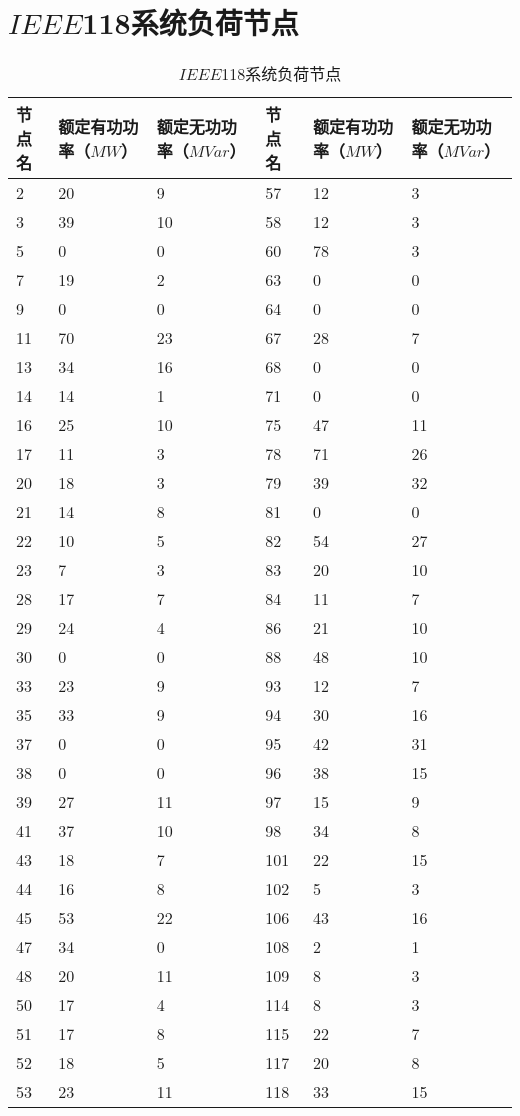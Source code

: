 \section{$IEEE$118系统负荷节点}
\begin{table}[H]
   \centering
   \caption{$IEEE$118系统负荷节点}
   \label{tab:chap5:load118}
     \begin{tabular}{C{1.2cm}C{2.4cm}C{2.4cm}C{1.2cm}C{2.4cm}C{2.4cm}}
\toprule
 \textbf{节点名}        &\textbf{额定有功功率（$MW$）}      &\textbf{额定无功功率（$MVar$）}   & \textbf{节点名}        &\textbf{额定有功功率（$MW$）}      &\textbf{额定无功功率（$MVar$）}       \\
  & 20 & 9  & 57  & 12 & 3  \\
3  & 39 & 10 & 58  & 12 & 3  \\
5  & 0  & 0  & 60  & 78 & 3  \\
7  & 19 & 2  & 63  & 0  & 0  \\
9  & 0  & 0  & 64  & 0  & 0  \\
11 & 70 & 23 & 67  & 28 & 7  \\
13 & 34 & 16 & 68  & 0  & 0  \\
14 & 14 & 1  & 71  & 0  & 0  \\
16 & 25 & 10 & 75  & 47 & 11 \\
17 & 11 & 3  & 78  & 71 & 26 \\
20 & 18 & 3  & 79  & 39 & 32 \\
21 & 14 & 8  & 81  & 0  & 0  \\
22 & 10 & 5  & 82  & 54 & 27 \\
23 & 7  & 3  & 83  & 20 & 10 \\
28 & 17 & 7  & 84  & 11 & 7  \\
29 & 24 & 4  & 86  & 21 & 10 \\
30 & 0  & 0  & 88  & 48 & 10 \\
33 & 23 & 9  & 93  & 12 & 7  \\
35 & 33 & 9  & 94  & 30 & 16 \\
37 & 0  & 0  & 95  & 42 & 31 \\
38 & 0  & 0  & 96  & 38 & 15 \\
39 & 27 & 11 & 97  & 15 & 9  \\
41 & 37 & 10 & 98  & 34 & 8  \\
43 & 18 & 7  & 101 & 22 & 15 \\
44 & 16 & 8  & 102 & 5  & 3  \\
45 & 53 & 22 & 106 & 43 & 16 \\
47 & 34 & 0  & 108 & 2  & 1  \\
48 & 20 & 11 & 109 & 8  & 3  \\
50 & 17 & 4  & 114 & 8  & 3  \\
51 & 17 & 8  & 115 & 22 & 7  \\
52 & 18 & 5  & 117 & 20 & 8  \\
53 & 23 & 11 & 118 & 33 & 15 \\
\bottomrule
\end{tabular}
\end{table}
